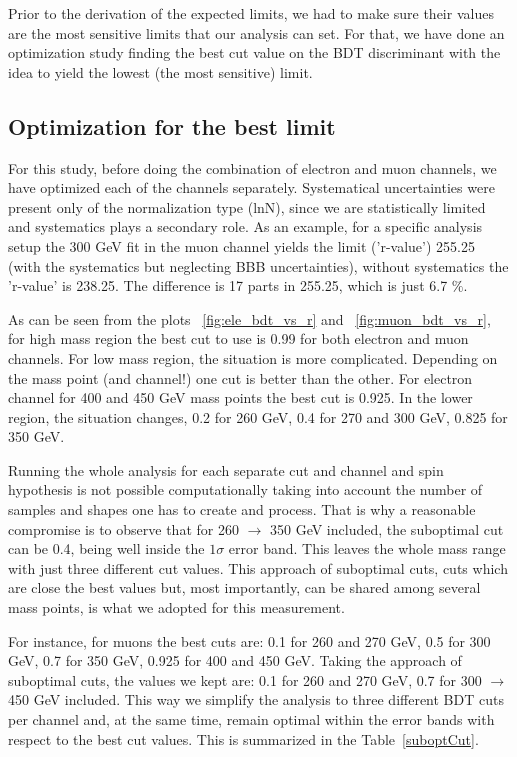 Prior to the derivation of the expected limits, we had to make sure their values are the most sensitive limits that our analysis can set. For that, we have done an optimization study finding the best cut value on the BDT discriminant with the idea to yield the lowest (the most sensitive) limit. 



\subsection{Optimization for the best limit}

For this study, before doing the combination of electron and muon channels, we have optimized each of the channels separately. Systematical uncertainties were present only of the normalization type (lnN), since we are statistically limited and systematics plays a secondary role. %
As an example, for a specific analysis setup the 300 GeV fit in the muon channel yields the limit ('r-value') 255.25 (with the systematics but neglecting BBB uncertainties), without systematics the 'r-value' is 238.25. The difference is 17 parts in 255.25, which is just 6.7 $\%$.

As can be seen from the plots ~\ref{fig:ele_bdt_vs_r} and ~\ref{fig:muon_bdt_vs_r}, for high mass region the best cut to use is 0.99 for both electron and muon channels. For low mass region, the situation is more complicated. Depending on the mass point (and channel!) one cut is better than the other. For electron channel for 400 and 450 GeV mass points the best cut is 0.925. In the lower region, the situation changes, 0.2 for 260 GeV, 0.4 for 270 and 300 GeV, 0.825 for 350 GeV. 

Running the whole analysis for each separate cut and channel and spin hypothesis is not possible computationally taking into account the number of samples and shapes one has to create and process. That is why a reasonable compromise is to observe that for 260 $\to$ 350 GeV included, the suboptimal cut can be 0.4, being well inside the $1\sigma$ error band. This leaves the whole mass range with just three different cut values. This approach of suboptimal cuts, cuts which are close the best values but, most importantly, can be shared among several mass points, is what we adopted for this measurement. 

For instance, for muons the best cuts are: 0.1 for 260 and 270 GeV, 0.5 for 300 GeV, 0.7 for 350 GeV, 0.925 for 400 and 450 GeV. Taking the approach of suboptimal cuts, the values we kept are: 0.1 for 260 and 270 GeV, 0.7 for 300 $\to$ 450 GeV included. This way we simplify the analysis to three different BDT cuts per channel and, at the same time, remain optimal within the error bands with respect to the best cut values. This is summarized in the Table~\ref{suboptCut}.


